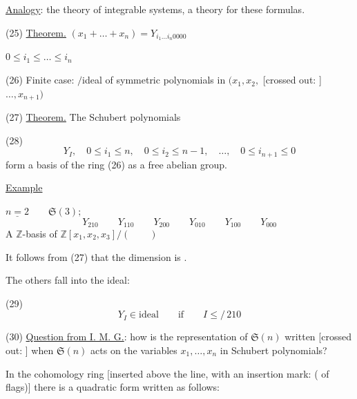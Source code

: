 \underline{Analogy}: the theory of integrable systems,  a theory for these formulas.

(25) \underline{Theorem.}
$(x_1+\dots+x_n)=Y_{i_1\dots i_n0000}$

$0\leq i_1\leq\dots\leq i_n$

(26) Finite case:
$\big/$ideal of symmetric polynomials in
$(x_1,x_2,$
[crossed out: ]
$\dots,x_{n+1})$

(27) \underline{Theorem.} The Schubert polynomials

(28)
\begin{equation*}
Y_I,\quad 0\leq i_1\leq n,\quad
0\leq i_2\leq n-1,\quad\dots,\quad
0\leq i_{n+1}\leq0
\end{equation*}
form a basis of the ring (26) as a free abelian group.

\underline{Example}

$\underline{n=2}\qquad\mathfrak{S}(3);$
\begin{equation*}
Y_{210}\qquad Y_{110}\qquad Y_{200}\qquad
Y_{010}\qquad Y_{100}\qquad Y_{000}
\end{equation*}
A $\mathbb{Z}$-basis of $\mathbb{Z}[x_1,x_2,x_3]/(\qquad)$

It follows from (27) that the dimension is
.

The others fall into the ideal:

(29)
\begin{equation*}
Y_I\in\mathrm{ideal}\qquad\text{if}\qquad I\leq\!\!\!/\,210
\end{equation*}

(30) \underline{Question from I. M. G.}: how is the representation of $\mathfrak{S}(n)$ written
[crossed out: ]
when $\mathfrak{S}(n)$ acts on the variables $x_1,\dots,x_n$ in Schubert
polynomials?

In the cohomology ring
[inserted above the line, with an insertion mark:
( of flags)]
there is a quadratic form written as follows:

